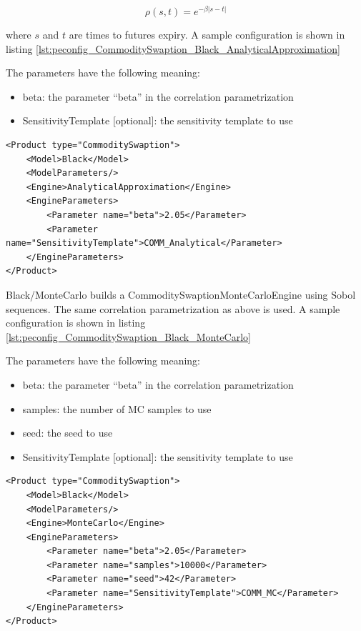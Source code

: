 $$\rho(s, t) = e^{-\beta |s-t|}$$

where $s$ and $t$ are times to futures expiry. A sample configuration is shown in listing
\ref{lst:peconfig_CommoditySwaption_Black_AnalyticalApproximation}

The parameters have the following meaning:

\begin{itemize}
\item beta: the parameter ``beta'' in the correlation parametrization
\item SensitivityTemplate [optional]: the sensitivity template to use
\end{itemize}

\begin{longlisting}
\begin{verbatim}
<Product type="CommoditySwaption">
    <Model>Black</Model>
    <ModelParameters/>
    <Engine>AnalyticalApproximation</Engine>
    <EngineParameters>
        <Parameter name="beta">2.05</Parameter>
        <Parameter name="SensitivityTemplate">COMM_Analytical</Parameter>
    </EngineParameters>
</Product>
\end{verbatim}
\caption{Configuration for Product CommoditySwaption, Model Black, Engine AnalyticalApproximation}
\label{lst:peconfig_CommoditySwaption_Black_AnalyticalApproximation}
\end{longlisting}

Black/MonteCarlo builds a CommoditySwaptionMonteCarloEngine using Sobol sequences. The same correlation parametrization
as above is used. A sample configuration is shown in listing
\ref{lst:peconfig_CommoditySwaption_Black_MonteCarlo}

The parameters have the following meaning:

\begin{itemize}
\item beta: the parameter ``beta'' in the correlation parametrization
\item samples: the number of MC samples to use
\item seed: the seed to use
\item SensitivityTemplate [optional]: the sensitivity template to use
\end{itemize}

\begin{longlisting}
\begin{verbatim}
<Product type="CommoditySwaption">
    <Model>Black</Model>
    <ModelParameters/>
    <Engine>MonteCarlo</Engine>
    <EngineParameters>
        <Parameter name="beta">2.05</Parameter>
        <Parameter name="samples">10000</Parameter>
        <Parameter name="seed">42</Parameter>
        <Parameter name="SensitivityTemplate">COMM_MC</Parameter>
    </EngineParameters>
</Product>
\end{verbatim}
\caption{Configuration for Product CommoditySwaption, Model Black, Engine MonteCarlo}
\label{lst:peconfig_CommoditySwaption_Black_MonteCarlo}
\end{longlisting}

